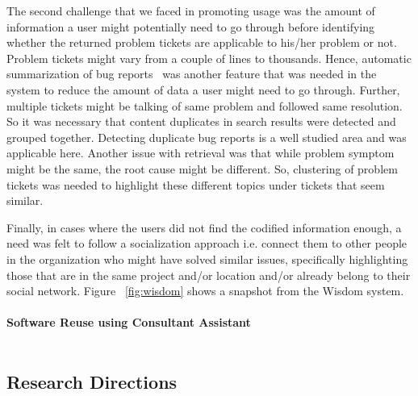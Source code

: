 The second challenge that we faced in promoting usage was the amount of information a user might potentially need to go through before identifying whether the returned problem tickets are applicable to his/her problem or not. Problem tickets might vary from a couple of lines to thousands. Hence, automatic summarization of bug reports~\cite{} was another feature that was needed in the system to reduce the amount of data a user might need to go through. Further, multiple tickets might be talking of same problem and followed same resolution. So it was necessary that content duplicates in search results were detected and grouped together. Detecting duplicate bug reports is a well studied area \cite{} and was applicable here. Another issue with retrieval was that while problem symptom might be the same, the root cause might be different. So, clustering of problem tickets was needed to highlight these different topics under tickets that seem similar. 

Finally, in cases where the users did not find the codified information enough, a need was felt to follow a socialization approach i.e. connect them to other people in the organization who might have solved similar issues, specifically highlighting those that are in the same project and/or location and/or already belong to their social network. Figure ~\ref{fig:wisdom} shows a snapshot from the Wisdom system.\\
\\
{\bf Software Reuse using Consultant Assistant}\\
\\


\subsection{Research Directions}
